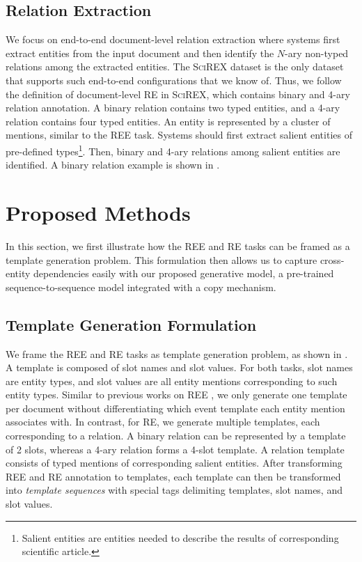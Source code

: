 \documentclass[11pt]{article}
\begin{document}
\subsection{Relation Extraction} We focus on end-to-end document-level relation extraction where systems first extract entities from the input document and then identify the $N$-ary non-typed relations among the extracted entities. The \textsc{SciREX} \cite{jain-etal-2020-scirex} dataset is the only dataset that supports such end-to-end configurations that we know of. Thus, we follow the definition of document-level RE in \textsc{SciREX}, which contains binary and 4-ary relation annotation. A binary relation contains two typed entities, and a 4-ary relation contains four typed entities. An entity is represented by a cluster of mentions, similar to the REE task. Systems should first extract salient entities of pre-defined types\footnote{Salient entities are entities needed to describe the results of corresponding scientific article.}. Then, binary and 4-ary relations among salient entities are identified. A binary relation example is shown in .
%
 \section{Proposed Methods}
In this section, we first illustrate how the REE and RE tasks can be framed as a template generation problem. This formulation then allows us to capture cross-entity dependencies easily with our proposed generative model, a pre-trained sequence-to-sequence model integrated with a copy mechanism.

\subsection{Template Generation Formulation}
\label{sec:ie_as_tempgen}
We frame the REE and RE tasks as template generation problem, as shown in . A template is composed of slot names and slot values. For both tasks, slot names are entity types, and slot values are all entity mentions corresponding to such entity types. Similar to previous works on REE \cite{huang-riloff-2011-peeling, du-cardie-2020-document, du-2020-grit}, we only generate one template per document without differentiating which event template each entity mention associates with. In contrast, for RE, we generate multiple templates, each corresponding to a relation. A binary relation can be represented by a template of 2 slots, whereas a 4-ary relation forms a 4-slot template. A relation template consists of typed mentions of corresponding salient entities. After transforming REE and RE annotation to templates, each template can then be transformed into \textit{template sequences} with special tags delimiting templates, slot names, and slot values. 
\end{document}

